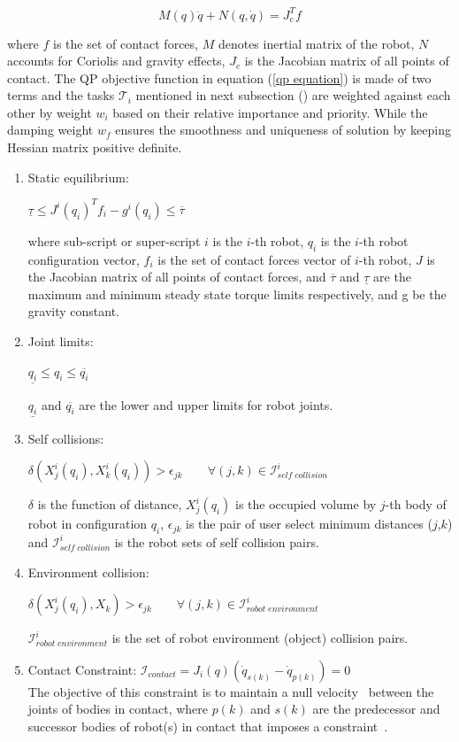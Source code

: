 \begin{equation}
	M(q)\ddot{q} + N(q,\dot{q}) =  J_c^T f
\end{equation}

where $f$ is the set of contact forces, $M$ denotes inertial matrix of the robot, $N$ accounts for Coriolis  and gravity effects, $J_c$ is the Jacobian matrix of all points of contact. The QP objective function in equation (\ref{qp equation}) is made of two terms and the tasks $\mathscr{T}_i$ mentioned in next subsection () are weighted against each other by weight $w_i$ based on their relative importance and priority. While the damping weight $w_f$ ensures the smoothness and uniqueness of solution by keeping Hessian matrix positive definite.

\begin{enumerate}	
	\item Static equilibrium:

	$\underline{\tau} \leq J^i(q_i)^Tf_i - g^i(q_i) \leq \overline{\tau}$
	
	where sub-script or super-script $i$ is the $i$-th robot, $q_i$ is the $i$-th robot configuration vector, $f_i$ is the set of contact forces vector of $i$-th robot, $J$ is the Jacobian matrix of all points of contact forces, and $\overline{\tau}$ and $\underline{\tau}$ are the maximum and minimum steady state torque limits respectively, and g be the gravity constant.
	
	\item Joint limits:
	
	$\underline{q_i} \leq q_i \leq \overline{q_i}$
	
	$\underline{q_i}$ and $\overline{q_i}$ are the lower and upper limits for robot joints.
	
	\item Self collisions:
	
	$\delta(X^i_j(q_i), X^i_k(q_i)) > \epsilon_{jk} \qquad \forall(j,k)\in {\mathscr{I}}^i_{self\; collision}$
	
	$\delta$ is the function of distance, $X^i_j(q_i)$ is the occupied volume by $j$-th body of robot in configuration $q_i$, $\epsilon_{jk}$ is the pair of user select minimum distances ($j$,$k$) and ${\mathscr{I}}^i_{self\;collision}$ is the robot sets of self collision pairs.
	
	\item Environment collision:
	
	$\delta(X^i_j(q_i), X_k) > \epsilon_{jk} \qquad \forall(j,k)\in {\mathscr{I}}^i_{robot\;environment}$
	
	${\mathscr{I}}^i_{robot\;environment}$ is the set of robot environment (object) collision pairs.
	
	\item Contact Constraint: $\mathscr{I}_{contact} = J_i(q) (\dot{q}_{s(k)} - \dot{q}_{p(k)}) = 0$\\
	The objective of this constraint is to maintain a null velocity~\cite{ohwovoriole1980externsion} between the joints of bodies in contact, where $p(k)$ and $s(k)$ are the predecessor and successor bodies of robot(s) in contact that imposes a constraint~\cite{featherstone2014rigid}.
\end{enumerate}

